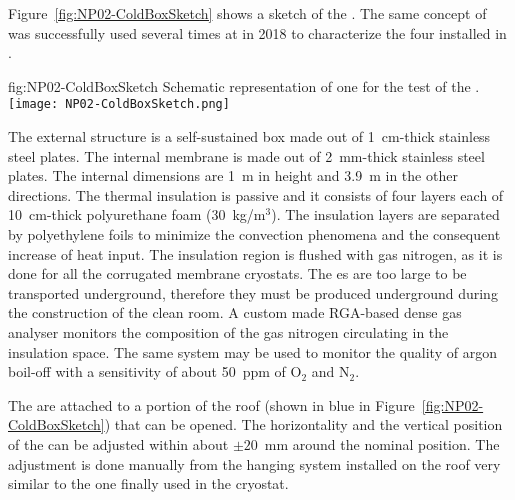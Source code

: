 Figure~\ref{fig:NP02-ColdBoxSketch} shows a sketch of the  \coldbox.
The same concept of  \coldbox was successfully used several times at  in 2018 to characterize the four  installed in .
\begin{dunefigure}{fig:NP02-ColdBoxSketch}
{Schematic representation of one \coldbox for the test of the .}
\texttt{[image: NP02-ColdBoxSketch.png]}
\end{dunefigure}
The external structure is a self-sustained box made out of 1~cm-thick stainless steel plates.
The internal membrane is made out of 2~mm-thick stainless steel plates.
The internal dimensions are 1~m in height and 3.9~m in the other directions.
The thermal insulation is passive and it consists of four layers each of 10~cm-thick polyurethane foam (30~kg/m$^3$).
The insulation layers are separated by polyethylene foils to minimize the convection phenomena and the consequent increase of heat input.
The insulation region is flushed with gas nitrogen, as it is done for all the corrugated membrane cryostats.
The  \coldbox{}es are too large to be transported underground, therefore they must be produced underground during the construction of the clean room.
A custom made RGA-based dense gas analyser monitors the composition of the gas nitrogen circulating in the insulation space.
The same system may be used to monitor the quality of argon boil-off with a sensitivity of about 50~ppm of O$_2$ and N$_2$.

The  are attached to a portion of the roof (shown in blue in Figure~\ref{fig:NP02-ColdBoxSketch}) that can be opened.
The horizontality and the vertical position of the  can be adjusted within about $\pm 20$~mm around the nominal position.
The adjustment is done manually from the hanging system installed on the  \coldbox roof very similar to the one finally used in the cryostat.

